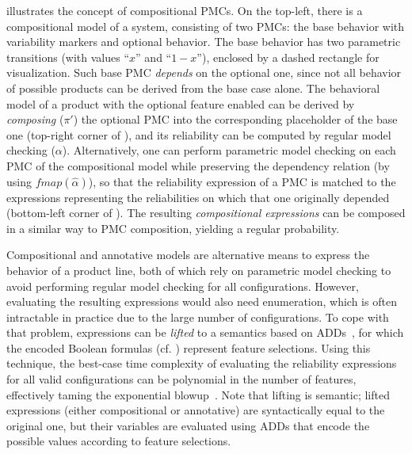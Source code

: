  illustrates the concept of compositional PMCs.
On the top-left, there is a compositional model of a system, consisting of two PMCs: the base behavior with variability markers and optional behavior.
The base behavior has two parametric transitions (with values ``$x$'' and ``$1-x$''), enclosed by a dashed rectangle for visualization.
Such base PMC \emph{depends} on the optional one, since not all behavior of possible products can be derived from the base case alone.
The behavioral model of a product with the optional feature enabled can be derived by \emph{composing} ($\pi'$) the optional PMC into the corresponding placeholder of the base one (top-right corner of ), and its reliability can be computed by regular model checking ($\alpha$).
Alternatively, one can perform parametric model checking on each PMC of the compositional model while preserving the dependency relation (by using $\mathit{fmap}(\hat{\alpha})$), so that the reliability expression of a PMC is matched to the expressions representing the reliabilities on which that one originally depended (bottom-left corner of ).
The resulting \emph{compositional expressions} can be composed in a similar way to PMC composition, yielding a regular probability.

Compositional and annotative models are alternative means to express the behavior of a product line, both of which rely on parametric model checking to avoid performing regular model checking for all configurations.
However, evaluating the resulting expressions would also need enumeration, which is %
often intractable in practice due to the large number of configurations.
To cope with that problem, expressions can be \emph{lifted} to a semantics based on ADDs~\cite{ADD}, for which the encoded Boolean formulas (cf. ) represent feature selections.
Using this technique, the best-case time complexity of evaluating the reliability expressions for all valid configurations can be polynomial in the number of features, effectively taming the exponential blowup~\cite{LANNA2017}.
Note that lifting is semantic; lifted expressions (either compositional or annotative) are syntactically equal to the original one, but their variables are evaluated using ADDs that encode the possible values according to feature selections.

